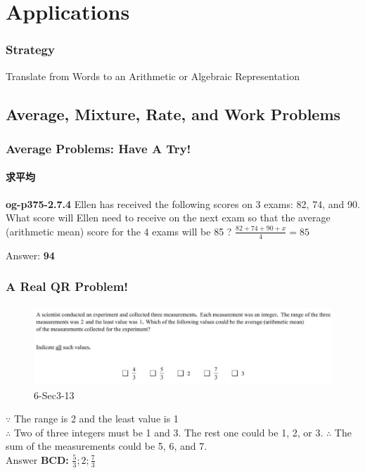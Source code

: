 \documentclass[
	11pt, %
]{beamer}
\begin{document}

\section{Applications}


\begin{frame}
\frametitle{Strategy}
{\LARGE Translate from Words to an Arithmetic or Algebraic Representation}
\end{frame}

\subsection{Average, Mixture, Rate, and Work Problems}


\begin{frame}
	\frametitle{Average Problems: Have A Try!}
	\framesubtitle{求平均}
	\textbf{og-p375-2.7.4}
	Ellen has received the following scores on 3 exams: 82, 74, and 90. What score will Ellen need to receive on the next exam so that the average (arithmetic mean) score for the 4 exams will be 85 ?
	\pause
	$\frac{82 + 74 + 90 + x}{4} = 85$

	\pause
	Answer: \textbf{94}
\end{frame}


\begin{frame}
	\frametitle{A Real QR Problem!}
	\framesubtitle{}
	\begin{figure}
		\includegraphics[width=\linewidth]{Average_Example_Question1.png}
		\caption{6-Sec3-13}
	\end{figure}
	\pause
$\because$ The range is 2 and the least value is 1 \\ 
$\therefore$ Two of three integers must be 1 and 3. 
The rest one could be 1, 2, or 3.
$\therefore$ The sum of the measurements could be 5, 6, and 7.\\
\pause
\bigskip
Answer \textbf{BCD: } $\frac{5}{3};2;\frac{7}{3}$
\end{frame}
\end{document}
